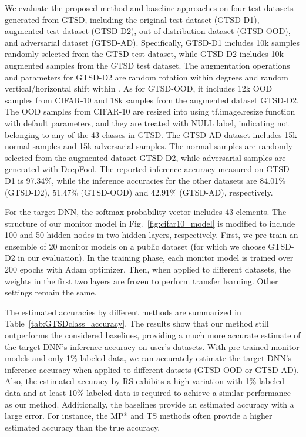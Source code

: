 \documentclass{article}
\newcommand{\monitorModel}{monitor model\xspace}
\begin{document}
We evaluate the proposed method and baseline approaches on four test datasets generated from GTSD, including the original test dataset (GTSD-D1), augmented test dataset (GTSD-D2), out-of-distribution dataset (GTSD-OOD), and adversarial dataset (GTSD-AD). Specifically, GTSD-D1 includes 10k samples randomly selected from the GTSD test dataset, while GTSD-D2 includes 10k augmented samples from the GTSD test dataset. The augmentation operations and parameters for GTSD-D2 are random rotation within  degrees and random vertical/horizontal shift within . As for GTSD-OOD, it includes 12k OOD samples from CIFAR-10 and 18k samples from the augmented dataset GTSD-D2. The OOD samples from CIFAR-10 are resized into  using tf.image.resize function with default parameters, and they are treated with NULL label, indicating not belonging to any of the 43 classes in GTSD. The GTSD-AD dataset includes 15k normal samples and 15k adversarial samples. The normal samples are randomly selected from the augmented dataset GTSD-D2, while adversarial samples are generated with DeepFool. The reported inference accuracy measured on GTSD-D1 is 97.34\%, while the inference accuracies for the other datasets are 84.01\% (GTSD-D2), 51.47\% (GTSD-OOD) and 42.91\% (GTSD-AD), respectively.

For the target DNN, the softmax probability vector  includes 43 elements. The structure of our monitor model in Fig.~\ref{fig:cifar10_model} is modified to
include 100 and 50 hidden nodes in two hidden layers, respectively. First, we pre-train an ensemble of 20 monitor models on a public dataset (for which we choose GTSD-D2 in our evaluation). In the training phase, each \monitorModel is trained over 200 epochs with Adam optimizer. Then, when applied to different datasets, the weights in the first two layers are frozen to perform transfer learning. Other settings remain the same.

The estimated accuracies by different methods  are summarized in Table~\ref{tab:GTSDclass_accuracy}. The results show that our method still outperforms
the considered baselines, providing a much more accurate estimate of the target DNN's inference accuracy on user's datasets. With pre-trained monitor models and only 1\% labeled data, we can accurately estimate the target DNN's inference accuracy when applied to different datsets (GTSD-OOD or GTSD-AD). Also, the estimated accuracy by RS exhibits a high variation with 1\% labeled data and at least 10\% labeled data is required to achieve a similar performance as our method. Additionally, the baselines provide an estimated accuracy with a large error. For instance, the MP* and TS methods often provide a higher estimated accuracy than the true accuracy.
\end{document}
